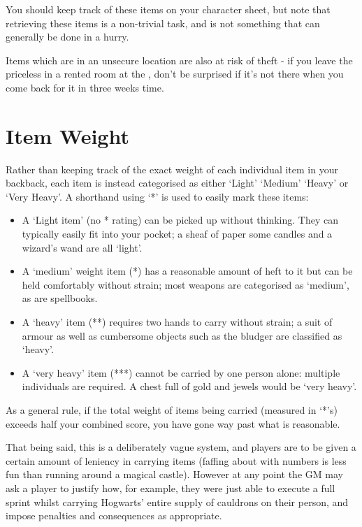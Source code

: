 You should keep track of these items on your character sheet, but note that retrieving these items is a non-trivial task, and is not something that can generally be done in a hurry. 

Items which are  in an unsecure location are also at risk of theft - if you leave the priceless  in a rented room at the , don't be surprised if it's not there when you come back for it in three weeks time. 



\section{Item Weight}

Rather than keeping track of the exact weight of each individual item in your backback\comma{}, each item is instead categorised as either `Light'\comma{} `Medium'\comma{} `Heavy' or `Very Heavy'. A shorthand using `*' is used to easily mark these items:
\begin{itemize}[itemsep = 0pt]
\item A `Light item' (no * rating) can be picked up without thinking. They can typically easily fit into your pocket; a sheaf of paper\comma{} some candles and a wizard's wand are all `light'. 

\item A `medium' weight item (*) has a reasonable amount of heft to it\comma{} but can be held comfortably without strain; most weapons are categorised as `medium', as are spellbooks.

\item A `heavy' item (**) requires two hands to carry without strain; a suit of armour\comma{} as well as cumbersome objects such as the bludger are classified as `heavy'.

\item A `very heavy' item (***) cannot be carried by one person alone: multiple individuals are required. A chest full of gold and jewels would be `very heavy'. 
\end{itemize}
As a general rule, if the total weight of items being carried (measured in `*'s) exceeds half your combined  score, you have gone way past what is reasonable.  

That being said, this is a deliberately vague system, and players are to be given a certain amount of leniency in carrying items (faffing about with numbers is less fun than running around a magical castle). However at any point the GM may ask a player to justify how, for example, they were just able to execute a full sprint whilst carrying Hogwarts' entire supply of cauldrons on their person, and impose penalties and consequences as appropriate. 




